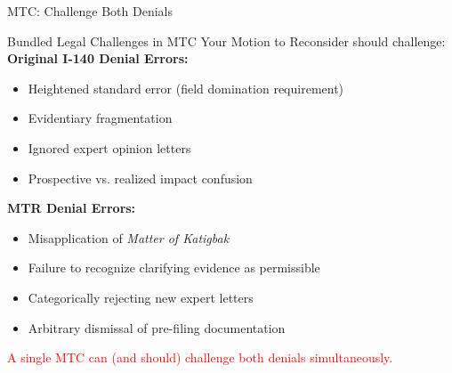 \documentclass[11pt]{beamer}
\begin{document}
	
	\begin{frame}{MTC: Challenge Both Denials}
		\scriptsize
		\begin{block}{Bundled Legal Challenges in MTC}
			Your Motion to Reconsider should challenge:
			\vspace{0.2cm}
			\textbf{Original I-140 Denial Errors:}
			\begin{itemize}
				\item Heightened standard error (field domination requirement)
				\item Evidentiary fragmentation
				\item Ignored expert opinion letters
				\item Prospective vs. realized impact confusion
			\end{itemize}
			\textbf{MTR Denial Errors:}
			\begin{itemize}
				\item Misapplication of \textit{Matter of Katigbak}
				\item Failure to recognize clarifying evidence as permissible
				\item Categorically rejecting new expert letters
				\item Arbitrary dismissal of pre-filing documentation
			\end{itemize}
			\textcolor{red}{A single MTC can (and should) challenge both denials simultaneously.}
		\end{block}
	\end{frame}
	
\end{document}
